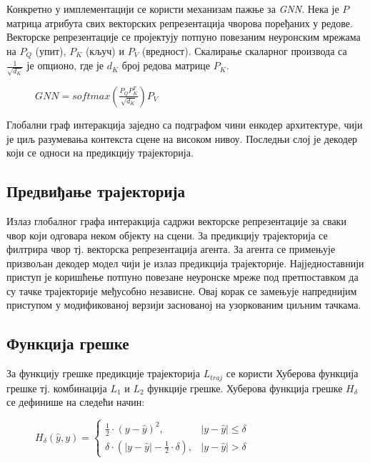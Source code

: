 \documentclass[11pt,oneside]{memoir}
\begin{document}
Конкретно у имплементацији се користи механизам пажње за \textit{GNN}.
Нека је $P$ матрица атрибута свих векторских репрезентација чворова поређаних у редове.
Векторске репрезентације се пројектују потпуно повезаним неуронским мрежама на $P_{Q}$ (упит), $P_{K}$ (кључ) и $P_{V}$ (вредност). 
Скалирање скаларног производа са $\frac{1}{\sqrt{d_{K}}}$ је опционо, где је $d_{K}$ број редова матрице $P_{K}$.

\begin{figure}[H]
  \centering
  $GNN = softmax(\frac{P_{Q}P^{T}_{K}}{\sqrt{d_{K}}})P_{V}$
\end{figure}

Глобални граф интеракција заједно са подграфом чини енкодер архитектуре,
чији је циљ разумевања контекста сцене на високом нивоу. Последњи слој је декодер који се односи на предикцију трајекторија.

\subsection{Предвиђање трајекторија}

Излаз глобалног графа интеракција садржи векторске репрезентације за сваки чвор који одговара неком објекту на сцени.
За предикцију трајекторија се филтрира чвор тј. векторска репрезентација агента. За агента се примењује призвољан декодер модел
чији је излаз предикција трајекторије. Најједноставнији приступ је коришћење потпуно повезане неуронске мреже под претпоставком да су 
тачке трајекторије међусобно независне. Овај корак се замењује напреднијим приступом у модификованој верзији заснованој на узоркованим циљним тачкама.

\subsection{Функција грешке}

За функцију грешке предикције трајекторија $L_{traj}$ се користи Хуберова функција грешке тј. комбинација $L_1$ и $L_2$ функције грешке. Хуберова функција грешке $H_{\delta}$ се дефинише на следећи начин:

\begin{figure}[H]
  \centering
  $H_{\delta}(\hat{y}, y) = \begin{cases}
    \frac{1}{2}\cdot(y - \hat{y})^2, & |y - \hat{y}| \leq \delta \\
    \delta \cdot (|y - \hat{y}| - \frac{1}{2}\cdot \delta), & |y - \hat{y}| > \delta
  \end{cases}$
\end{figure}
\end{document}
